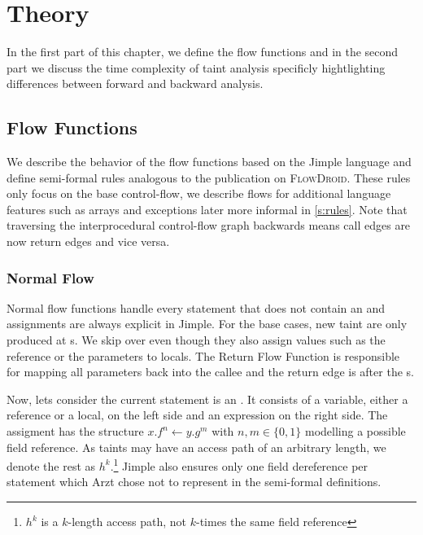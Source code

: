 \documentclass[../draft.tex]{subfiles}
\begin{document}
    \chapter{Theory}
    In the first part of this chapter, we define the flow functions and in the second part we discuss the time complexity of taint analysis specificly hightlighting differences between forward and backward analysis.

    \section{Flow Functions}\label{s:flowfunctions}
    We describe the behavior of the flow functions based on the Jimple language and define semi-formal rules analogous to the publication\cite{Arzt2017PhD} on \textsc{FlowDroid}. These rules only focus on the base control-flow, we describe flows for additional language features such as arrays and exceptions later more informal in \autoref{s:rules}. Note that traversing the interprocedural control-flow graph backwards means call edges are now return edges and vice versa. 

    \subsection{Normal Flow}\label{s:normalflow}
    Normal flow functions handle every statement that does not contain an  and assignments are always explicit in Jimple.
    For the base cases, new taint are only produced at s. We skip over  even though they also assign values such as the  reference or the parameters to locals. The Return Flow Function is responsible for mapping all parameters back into the callee and the return edge is after the s.

    Now, lets consider the current statement is an . It consists of a variable, either a reference or a local, on the left side and an expression on the right side. The assigment has the structure $x.f^n \leftarrow y.g^m$ with $n,m \in \{0,1\}$ modelling a possible field reference. As taints may have an access path of an arbitrary length, we denote the rest as $h^k$.\footnote{$h^k$ is a $k$-length access path, not $k$-times the same field reference} Jimple also ensures only one field dereference per statement which Arzt chose not to represent in the semi-formal definitions. 
\end{document}
